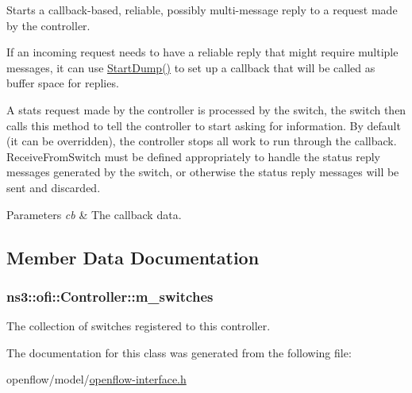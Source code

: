 Starts a callback-\/based, reliable, possibly multi-\/message reply to a request made by the controller. 

If an incoming request needs to have a reliable reply that might require multiple messages, it can use \hyperlink{classns3_1_1ofi_1_1Controller_ab45914c81455ec82bbc00d9cc4b0513f}{Start\+Dump()} to set up a callback that will be called as buffer space for replies.

A stats request made by the controller is processed by the switch, the switch then calls this method to tell the controller to start asking for information. By default (it can be overridden), the controller stops all work to run through the callback. Receive\+From\+Switch must be defined appropriately to handle the status reply messages generated by the switch, or otherwise the status reply messages will be sent and discarded.


\begin{DoxyParams}{Parameters}
{\em cb} & The callback data. \\
\hline
\end{DoxyParams}


\subsection{Member Data Documentation}
\subsubsection[{\texorpdfstring{m\+\_\+switches}{m_switches}}]{ ns3\+::ofi\+::\+Controller\+::m\+\_\+switches\hspace{0.3cm}{\ttfamily [protected]}}\hypertarget{classns3_1_1ofi_1_1Controller_a44e6c7d999d43f70416d628b61df44d2}{}\label{classns3_1_1ofi_1_1Controller_a44e6c7d999d43f70416d628b61df44d2}


The collection of switches registered to this controller. 



The documentation for this class was generated from the following file\+:\begin{DoxyCompactItemize}
\item 
openflow/model/\hyperlink{openflow-interface_8h}{openflow-\/interface.\+h}\end{DoxyCompactItemize}
